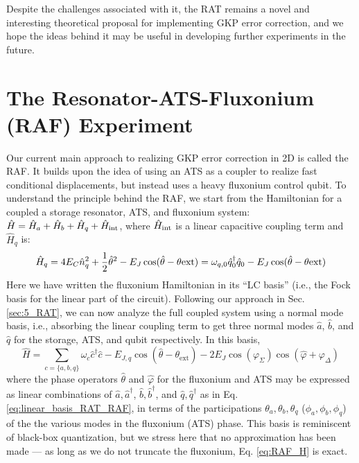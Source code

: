 Despite the challenges associated with it, the RAT remains a novel and interesting theoretical proposal for implementing GKP error correction, and we hope the ideas behind it may be useful in developing further experiments in the future. 
 \clearpage

\section{The Resonator-ATS-Fluxonium (RAF) Experiment \label{sec:5_RAF}}

Our current main approach to realizing GKP error correction in 2D is called the RAF. It builds upon the idea of using an ATS as a coupler to realize fast conditional displacements, but instead uses a heavy fluxonium control qubit. To understand the principle behind the RAF, we start from the Hamiltonian for a coupled a storage resonator, ATS, and fluxonium system: $\hat{H} = \hat{H}_a + \hat{H}_b + \hat{H}_q + \hat{H}_{\rm int}$, where $\hat{H}_{\rm int}$ is a linear capacitive coupling term and $\hat{H}_q$ is:
\begin{equation}
    \hat{H}_q = 4E_C \hat{n}_q^2 + \frac{1}{2}\hat{\theta}^2 - E_J\cos(\hat{\theta}-\theta{\rm ext}) = \omega_{q, 0} \hat{q}_0^\dagger\hat{q}_0 - E_J\cos(\hat{\theta}-\theta{\rm ext})
\end{equation}
Here we have written the fluxonium Hamiltonian in its ``LC basis'' (i.e., the Fock basis for the linear part of the circuit). Following our approach in Sec. \ref{sec:5_RAT}, we can now analyze the full coupled system using a normal mode basis, i.e., absorbing the linear coupling term to get three normal modes $\hat{a}$, $\hat{b}$, and $\hat{q}$ for the storage, ATS, and qubit respectively. In this basis, 
\begin{equation}
    \hat{H} = \sum_{c = \{a, b, q\}}\omega_c \hat{c}^\dagger \hat{c} - E_{J,q}\cos(\hat{\theta}-\theta_\mathrm{ext}) - 2E_J \cos(\varphi_\Sigma)\cos(\hat{\varphi} + \varphi_\Delta)
    \label{eq:RAF_H}
\end{equation}
where the phase operators $\hat{\theta}$ and $\hat{\varphi}$ for the fluxonium and ATS may be expressed as linear combinations of $\hat{a}, \hat{a}^\dagger$, $\hat{b}, \hat{b}^\dagger$, and $\hat{q}, \hat{q}^\dagger$ as in Eq. \eqref{eq:linear_basis_RAT_RAF}, in terms of the participations $\theta_a, \theta_b, \theta_q$ ($\phi_a, \phi_b, \phi_q$) of the the various modes in the fluxonium (ATS) phase. This basis is reminiscent of black-box quantization, but we stress here that no approximation has been made --- as long as we do not truncate the fluxonium, Eq. \eqref{eq:RAF_H} is exact. 

